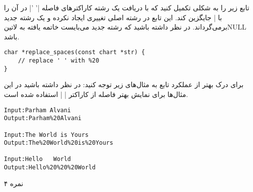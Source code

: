 
تابع زیر را به شکلی تکمیل کنید که با دریافت یک رشته کاراکترهای فاصله |' '| در آن را با |%
جایگزین کند. این تابع در رشته اصلی تغییری ایجاد نکرده و یک رشته جدید برمی‌گرداند. در نظر داشته باشید که رشته جدید می‌بایست خاتمه یافته به ‌لاتین{NULL} باشد.

\begin{latin}
\begin{verbatim}
char *replace_spaces(const chart *str) {
    // replace ' ' with %20
}

\end{verbatim}
\end{latin}

برای درک بهتر از عملکرد تابع به مثال‌های زیر توجه کنید:
در نظر داشته باشید در این مثال‌ها برای نمایش بهتر فاصله از کاراکتر | | استفاده شده است.

\begin{latin}
\begin{verbatim}
Input:Parham Alvani
Output:Parham%20Alvani

Input:The World is Yours
Output:The%20World%20is%20Yours

Input:Hello   World
Output:Hello%20%20%20World
\end{verbatim}
\end{latin}

۴ نمره



